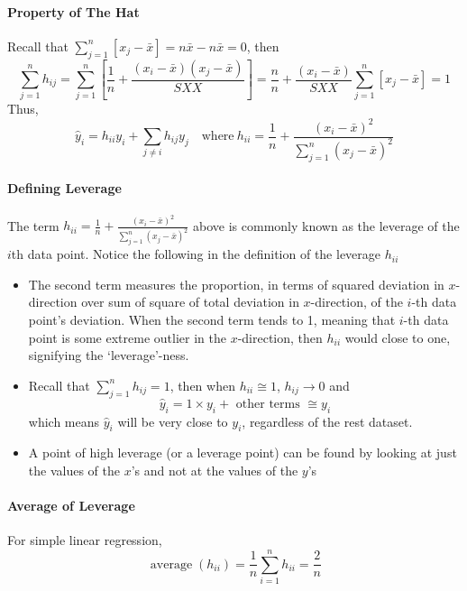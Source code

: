 \documentclass[11pt]{article}
\begin{document}
\paragraph{Property of The Hat}
Recall that $\sum_{j=1}^{n}\left[x_{j}-\bar{x}\right]=n\bar{x} - n\bar{x}=0$, then
\begin{equation*}
    \sum_{j=1}^{n} h_{i j}=\sum_{j=1}^{n}\left[\frac{1}{n}+\frac{\left(x_{i}-\bar{x}\right)\left(x_{j}-\bar{x}\right)}{S X X}\right]=\frac{n}{n}+\frac{\left(x_{i}-\bar{x}\right)}{S X X} \sum_{j=1}^{n}\left[x_{j}-\bar{x}\right]=1
\end{equation*}
Thus,
\begin{equation*}
    \hat{y}_{i}=h_{i i} y_{i}+\sum_{j \neq i} h_{i j} y_{j} \quad \text{where}~h_{i i}=\frac{1}{n}+\frac{\left(x_{i}-\bar{x}\right)^{2}}{\sum_{j=1}^{n}\left(x_{j}-\bar{x}\right)^{2}}
\end{equation*}
\paragraph{Defining Leverage} 
The term $h_{i i}=\frac{1}{n}+\frac{\left(x_{i}-\bar{x}\right)^{2}}{\sum_{j=1}^{n}\left(x_{j}-\bar{x}\right)^{2}}$ above is commonly known as the leverage of the $i$th data point. Notice the following in the definition of the leverage $h_{ii}$
\begin{itemize}
    \item The second term measures the proportion, in terms of squared deviation in $x$-direction over sum of square of total deviation in $x$-direction, of the $i$-th data point's deviation. When the second term tends to 1, meaning that $i$-th data point is some extreme outlier in the $x$-direction, then $h_{ii}$ would close to one, signifying the `leverage'-ness. 
    \item Recall that $\sum_{j=1}^{n} h_{i j}=1$, then when $h_{i i} \cong 1$, $h_{ij}\rightarrow 0$ and
        \begin{equation*}
            \hat{y}_{i}=1 \times y_{i}+\text { other terms } \cong y_{i}
        \end{equation*}
    which means $\hat{y}_{i}$  will be very close to $y_i$, regardless of the rest dataset. 
    \item A point of high leverage (or a leverage point) can be found by looking at just the values of the $x$’s and not at the values of the $y$’s
\end{itemize}

\paragraph{Average of Leverage} For simple linear regression, 
\begin{equation*}
    \operatorname{average}\left(h_{i i}\right) = \frac{1}{n}\sum_{i = 1}^n h_{ii} =\frac{2}{n}
\end{equation*}
\end{document}
